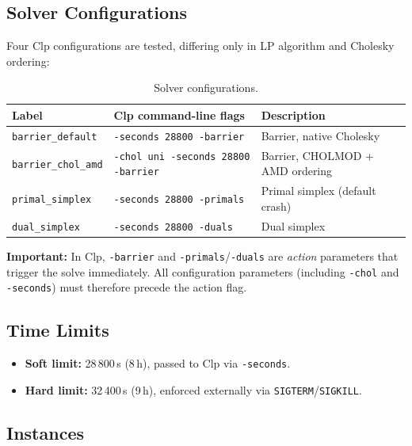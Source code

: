 \documentclass[11pt,a4paper]{article}
\begin{document}
\subsection{Solver Configurations}

Four Clp configurations are tested, differing only in LP algorithm and
Cholesky ordering:

\begin{table}[h]
\centering
\caption{Solver configurations.}
\label{tab:configs}
\begin{tabular}{@{}lll@{}}
\toprule
\textbf{Label} & \textbf{Clp command-line flags} & \textbf{Description} \\
\midrule
\texttt{barrier\_default}  & \texttt{-seconds 28800 -barrier}           & Barrier, native Cholesky \\
\texttt{barrier\_chol\_amd} & \texttt{-chol uni -seconds 28800 -barrier} & Barrier, CHOLMOD + AMD ordering \\
\texttt{primal\_simplex}   & \texttt{-seconds 28800 -primals}           & Primal simplex (default crash) \\
\texttt{dual\_simplex}     & \texttt{-seconds 28800 -duals}             & Dual simplex \\
\bottomrule
\end{tabular}
\end{table}

\noindent\textbf{Important:} In Clp, \texttt{-barrier} and \texttt{-primals}/\texttt{-duals}
are \emph{action} parameters that trigger the solve immediately.  All
configuration parameters (including \texttt{-chol} and \texttt{-seconds})
must therefore precede the action flag.

\subsection{Time Limits}

\begin{itemize}
  \item \textbf{Soft limit:} 28\,800\,s (8\,h), passed to Clp via
        \texttt{-seconds}.
  \item \textbf{Hard limit:} 32\,400\,s (9\,h), enforced externally via
        \texttt{SIGTERM}/\texttt{SIGKILL}.
\end{itemize}

\subsection{Instances}
\end{document}

